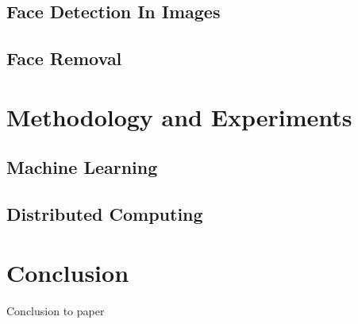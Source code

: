 \documentclass[
	submission,
	final,
	notitlepage,
	narroweqnarray,
	inline,
	twoside,
	]{ieee}
\begin{document}
\subsection{Face Detection In Images}
\subsection{Face Removal}


\section{Methodology and Experiments} 
\subsection{Machine Learning} 
\subsection{Distributed Computing}

\section{Conclusion}
\PARstart Conclusion to paper



\end{document}
